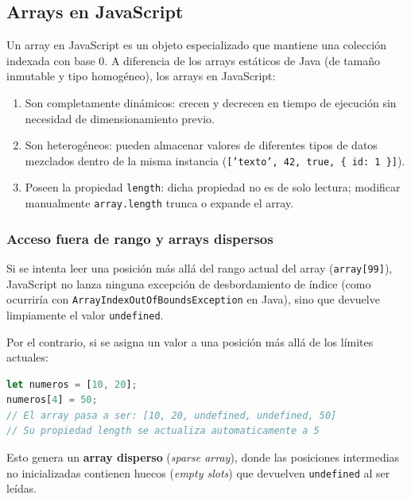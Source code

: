 \subsection{Arrays en JavaScript}

Un array en JavaScript es un objeto especializado que mantiene una colección indexada con base 0. A diferencia de los arrays estáticos de Java (de tamaño inmutable y tipo homogéneo), los arrays en JavaScript:
\begin{enumerate}
    \item Son completamente dinámicos: crecen y decrecen en tiempo de ejecución sin necesidad de dimensionamiento previo.
    \item Son heterogéneos: pueden almacenar valores de diferentes tipos de datos mezclados dentro de la misma instancia (\texttt{['texto', 42, true, \{ id: 1 \}]}).
    \item Poseen la propiedad \texttt{length}: dicha propiedad no es de solo lectura; modificar manualmente \texttt{array.length} trunca o expande el array.
\end{enumerate}

\subsubsection{Acceso fuera de rango y arrays dispersos}
Si se intenta leer una posición más allá del rango actual del array (\texttt{array[99]}), JavaScript no lanza ninguna excepción de desbordamiento de índice (como ocurriría con \texttt{ArrayIndexOutOfBoundsException} en Java), sino que devuelve limpiamente el valor \texttt{undefined}.

Por el contrario, si se asigna un valor a una posición más allá de los límites actuales:
\begin{lstlisting}[language=javascript]
let numeros = [10, 20];
numeros[4] = 50; 
// El array pasa a ser: [10, 20, undefined, undefined, 50]
// Su propiedad length se actualiza automaticamente a 5
\end{lstlisting}
Esto genera un \textbf{array disperso} (\emph{sparse array}), donde las posiciones intermedias no inicializadas contienen huecos (\emph{empty slots}) que devuelven \texttt{undefined} al ser leídas.

